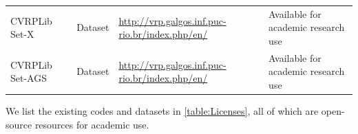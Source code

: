 \documentclass{article}
\theoremstyle{plain}
\theoremstyle{definition}
\theoremstyle{remark}
\begin{document}
\begin{table}[h!]
{\begin{tabular}{l |l | l | l }
CVRPLib Set-X \citep{uchoa2017cvrplib_setx} & Dataset & \url{http://vrp.galgos.inf.puc-rio.br/index.php/en/}  & Available for academic research use \\
CVRPLib Set-AGS \citep{arnold2019cvrplib_xxl} & Dataset & \url{http://vrp.galgos.inf.puc-rio.br/index.php/en/}  & Available for academic research use \\

\bottomrule[0.5mm]
\end{tabular}%
}
\end{table}
We list the existing codes and datasets in \cref{table:Licenses}, all of which are open-source resources for academic use.
\end{document}
